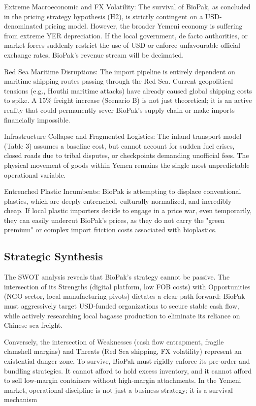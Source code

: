\documentclass[12pt,a4paper]{article}
\begin{document}
Extreme Macroeconomic and FX Volatility: The survival of BioPak, as concluded in the pricing strategy hypothesis (H2), is strictly contingent on a USD-denominated pricing model. However, the broader Yemeni economy is suffering from extreme YER depreciation. If the local government, de facto authorities, or market forces suddenly restrict the use of USD or enforce unfavourable official exchange rates, BioPak's revenue stream will be decimated.

Red Sea Maritime Disruptions: The import pipeline is entirely dependent on maritime shipping routes passing through the Red Sea. Current geopolitical tensions (e.g., Houthi maritime attacks) have already caused global shipping costs to spike. A 15\% freight increase (Scenario B) is not just theoretical; it is an active reality that could permanently sever BioPak's supply chain or make imports financially impossible.

Infrastructure Collapse and Fragmented Logistics: The inland transport model (Table 3) assumes a baseline cost, but cannot account for sudden fuel crises, closed roads due to tribal disputes, or checkpoints demanding unofficial fees. The physical movement of goods within Yemen remains the single most unpredictable operational variable.

Entrenched Plastic Incumbents: BioPak is attempting to displace conventional plastics, which are deeply entrenched, culturally normalized, and incredibly cheap. If local plastic importers decide to engage in a price war, even temporarily, they can easily undercut BioPak's prices, as they do not carry the "green premium" or complex import friction costs associated with bioplastics.

\subsection{Strategic Synthesis}

The SWOT analysis reveals that BioPak's strategy cannot be passive. The intersection of its Strengths (digital platform, low FOB costs) with Opportunities (NGO sector, local manufacturing pivots) dictates a clear path forward: BioPak must aggressively target USD-funded organizations to secure stable cash flow, while actively researching local bagasse production to eliminate its reliance on Chinese sea freight.

Conversely, the intersection of Weaknesses (cash flow entrapment, fragile clamshell margins) and Threats (Red Sea shipping, FX volatility) represent an existential danger zone. To survive, BioPak must rigidly enforce its pre-order and bundling strategies. It cannot afford to hold excess inventory, and it cannot afford to sell low-margin containers without high-margin attachments. In the Yemeni market, operational discipline is not just a business strategy; it is a survival mechanism
\end{document}
